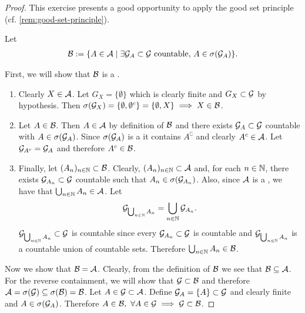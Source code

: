 \begin{proof}
	This exercise presents a good opportunity to apply the good set principle (cf. \autoref{rem:good-set-principle}).
	
	Let
	\begin{align*}
		\mathcal{B} := \{ A \in \mathcal{A} \mid \exists \mathcal{G}_A \subset \mathcal{G} \text{ countable, } A \in \sigma(\mathcal{G}_A)\}.
	\end{align*}
	
	First, we will show that $\mathcal{B}$ is a \siga.
	\begin{enumerate}
		\item Clearly $X \in \mathcal{A}$. Let $G_X = \{\emptyset\}$ which is clearly finite and $G_X \subset \mathcal{G}$ by hypothesis. Then $\sigma(\mathcal{G}_X) = \{\emptyset, \emptyset^c\} = \{\emptyset, X\} \implies X \in \mathcal{B}$.
		\item Let $A \in \mathcal{B}$. Then $A \in \mathcal{A}$ by definition of $\mathcal{B}$ and there exists $\mathcal{G}_A \subset \mathcal{G}$ countable with $A \in \sigma(\mathcal{G}_A)$. Since $\sigma(\mathcal{G}_A)$ is a \siga it contains $A^\complement$ and clearly $A^c \in \mathcal{A}$. Let $\mathcal{G}_{A^c} = \mathcal{G}_A$ and therefore $A^c \in \mathcal{B}$.
		\item Finally, let $(A_n)_{n\in\mathbb{N}} \subset \mathcal{B}$. Clearly, $(A_n)_{n\in\mathbb{N}} \subset \mathcal{A}$ and, for each $n \in \mathbb{N}$, there exists $\mathcal{G}_{A_n} \subset \mathcal{G}$ countable such that $A_n \in \sigma(\mathcal{G}_{A_n})$. Also, since $\mathcal{A}$ is a \siga, we have that $\bigcup_{n\in\mathbb{N}}A_n \in \mathcal{A}$. Let
		\begin{align*}
			\mathcal{G}_{\bigcup_{n\in\mathbb{N}} A_n} = \bigcup_{n\in\mathbb{N}} \mathcal{G}_{A_n}.
		\end{align*}
		$\mathcal{G}_{\bigcup_{n\in\mathbb{N}} A_n} \subset \mathcal{G}$ is countable since every $\mathcal{G}_{A_n} \subset \mathcal{G}$ is countable and $\mathcal{G}_{\bigcup_{n\in\mathbb{N}} A_n}$ is a countable union of countable sets. Therefore $\bigcup_{n\in\mathbb{N}} A_n \in \mathcal{B}$.
	\end{enumerate}

	Now we show that $\mathcal{B} = \mathcal{A}$. Clearly, from the definition of $\mathcal{B}$ we see that $\mathcal{B} \subseteq \mathcal{A}$. For the reverse containment, we will show that $\mathcal{G} \subset \mathcal{B}$ and therefore $\mathcal{A} = \sigma(\mathcal{G}) \subseteq \sigma(\mathcal{B}) = \mathcal{B}$. Let $A \in \mathcal{G} \subset \mathcal{A}$. Define $\mathcal{G}_A = \{A\} \subset \mathcal{G}$ and clearly finite and $A \in \sigma(\mathcal{G}_A)$. Therefore $A \in \mathcal{B},\ \forall A \in \mathcal{G} \implies \mathcal{G}\subset \mathcal{B}$.
\end{proof}

